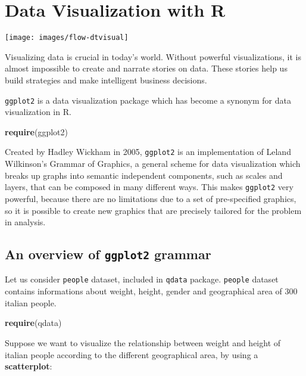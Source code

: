 \documentclass[]{book}
\newenvironment{Shaded}{\begin{snugshade}}{\end{snugshade}}
\newcommand{\KeywordTok}[1]{\textcolor[rgb]{0.13,0.29,0.53}{\textbf{{#1}}}}
\newcommand{\NormalTok}[1]{{#1}}
\begin{document}
\chapter{Data Visualization with R}\label{data-visualization-with-r}

\texttt{[image: images/flow-dtvisual]}

Visualizing data is crucial in today's world. Without powerful
visualizations, it is almost impossible to create and narrate stories on
data. These stories help us build strategies and make intelligent
business decisions.

\texttt{ggplot2} is a data visualization package which has become a
synonym for data visualization in R.

\begin{Shaded}
\begin{Highlighting}[]
\KeywordTok{require}\NormalTok{(ggplot2)}
\end{Highlighting}
\end{Shaded}

Created by Hadley Wickham in 2005, \texttt{ggplot2} is an implementation
of Leland Wilkinson's Grammar of Graphics, a general scheme for data
visualization which breaks up graphs into semantic independent
components, such as scales and layers, that can be composed in many
different ways. This makes \texttt{ggplot2} very powerful, because there
are no limitations due to a set of pre-specified graphics, so it is
possible to create new graphics that are precisely tailored for the
problem in analysis.

\section{\texorpdfstring{An overview of \texttt{ggplot2}
grammar}{An overview of ggplot2 grammar}}\label{an-overview-of-ggplot2-grammar}

Let us consider \texttt{people} dataset, included in \texttt{qdata}
package. \texttt{people} dataset contains informations about weight,
height, gender and geographical area of 300 italian people.

\begin{Shaded}
\begin{Highlighting}[]
\KeywordTok{require}\NormalTok{(qdata)}
\end{Highlighting}
\end{Shaded}

Suppose we want to visualize the relationship between weight and height
of italian people according to the different geographical area, by using
a \textbf{scatterplot}:
\end{document}

